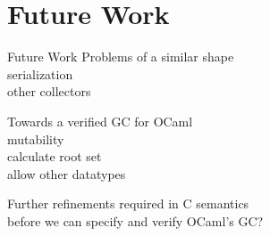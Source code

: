\documentclass[usenames, xcolor=dvipsnames]{beamer}
\begin{document}
\section{Future Work}
\begin{frame}{Future Work}
  Problems of a \alert{similar shape} \\
  \pause 
  \hspace{1em}serialization \\ 
  \hspace{1em}other collectors

  \bigskip

  \pause
  Towards a verified GC for \alert{OCaml} \\
  \pause 
  \hspace{1em}mutability \\ 
  \hspace{1em}calculate root set \\ 
  \hspace{1em}allow other datatypes

  \bigskip
  \pause \alert{Further refinements} required in C semantics \\ 
  \hspace{1em}before we can \alert{specify} and \alert{verify} OCaml's GC?
  \end{frame}
\end{document}
